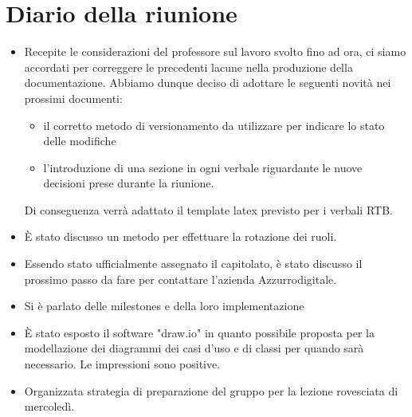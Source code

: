 \section{Diario della riunione}

\begin{itemize}
    \item Recepite le considerazioni del professore sul lavoro svolto fino ad ora, ci siamo accordati per correggere le precedenti lacune nella produzione della documentazione. Abbiamo dunque deciso di adottare le seguenti novità nei prossimi documenti:
    \begin{itemize}
        \item il corretto metodo di versionamento da utilizzare per indicare lo stato delle modifiche
        \item l'introduzione di una sezione in ogni verbale riguardante le nuove decisioni prese durante la riunione.
    \end{itemize}
    Di conseguenza verrà adattato il template latex previsto per i verbali RTB.
    \item È stato discusso un metodo per effettuare la rotazione dei ruoli.
    \item Essendo stato ufficialmente assegnato il capitolato, è stato discusso il prossimo passo da fare per contattare l'azienda Azzurrodigitale.
    \item Si è parlato delle milestones e della loro implementazione
    \item È stato esposto il software "draw.io" in quanto possibile proposta per la modellazione dei diagrammi dei casi d'uso e di classi per quando sarà necessario. Le impressioni sono positive.
    \item Organizzata strategia di preparazione del gruppo per la lezione rovesciata di mercoledì.
\end{itemize}